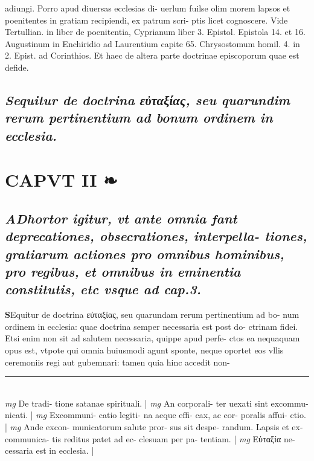 \documentclass{article}
\begin{document}
\begin{pages}
adiungi. Porro apud diuersas ecclesias di- uerlum fuilse olim morem lapsos et poenitentes in gratiam recipiendi, ex patrum scri- ptis licet cognoscere. Vide Tertullian. in liber  de poenitentia, Cyprianum liber  3. Epistol. Epistola 14. et 16. Augustinum in Enchiridio ad Laurentium capite 65. Chrysostomum homil. 4. in 2. Epist. ad Corinthios. Et haec de altera parte doctrinae episcoporum quae est defide.  \pend
{}
{}
\subsection*{\textit{Sequitur de doctrina εὐταξίας, seu quarundim rerum pertinentium ad bonum ordinem in ecclesia. }}
\endnumbering\beginnumbering\section{CAPVT II ❧}
{}
\subsection*{\textit{\huge\textbf{A}\normalsize Dhortor igitur, vt ante omnia fant deprecationes, obsecrationes, interpella- tiones, gratiarum actiones pro omnibus hominibus, pro regibus, et omnibus in eminentia constitutis, etc vsque  ad cap.3. }}\pstart \huge\textbf{S}\normalsize Equitur de doctrina εὐταξίας, seu quarundam rerum pertinentium ad bo- num ordinem in ecclesia: quae doctrina semper necessaria est post do- ctrinam fidei. Etsi enim non sit ad salutem necessaria, quippe apud perfe- ctos ea nequaquam opus est, vtpote qui omnia huiusmodi agunt sponte, neque oportet eos vllis ceremoniis regi aut gubemnari: tamen quia hinc accedit non-  \pend
\vspace{0.5cm}\noindent
\vspace{0.2cm}\rule{1cm}{0.2pt}\\ 
\hspace{0.2cm}\textit{mg}
\footnotesize De tradi- tione satanae spirituali. 
\normalsize| 
\hspace{0.2cm}\textit{mg}
\footnotesize An corporali- ter uexati sint excommu- nicati. 
\normalsize| 
\hspace{0.2cm}\textit{mg}
\footnotesize Excommuni- catio legiti- na aeque  effi- cax, ac cor- poralis affui- ctio. 
\normalsize| 
\hspace{0.2cm}\textit{mg}
\footnotesize Ande excon- municatorum salute pror- sus sit despe- randum. Lapsis et ex- communica- tis reditus patet ad ec- clesuam per pa- tentiam. 
\normalsize| 
\hspace{0.2cm}\textit{mg}
\footnotesize Εὐταξία ne- cessaria est in ecclesia. 
\normalsize| 

\end{pages}
\end{document}
